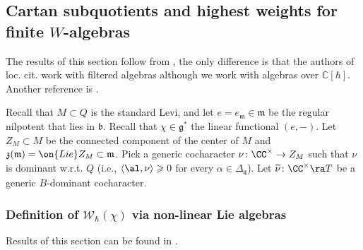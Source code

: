 \documentclass[12pt]{amsart}
\begin{document}
    










\subsection{Cartan subquotients and highest weights for finite $W$-algebras}
The results of this section follow from \cite{BGK}, the only difference is that the authors of loc. cit. work with filtered algebras although we work with algebras over $\mathbb{C}[\hbar]$. Another reference is \cite{LosevStructureO}. 


Recall that $M \subset Q$ is the standard Levi, and let $e=e_{\mathfrak{m}} \in \mathfrak{m}$ be the regular nilpotent that lies in $\mathfrak{b}$. Recall that $\chi \in \mathfrak{g}^*$ the linear functional $(e,-)$.  Let $Z_M \subset M$ be the connected component of the center of $M$ and $\mathfrak{z}(\mathfrak{m})=\on{Lie}Z_M \subset \mathfrak{m}$. Pick a generic cocharacter $\nu\colon \CC^\times \rightarrow Z_M$ such that $\nu$ is dominant w.r.t. $Q$ (i.e., $\langle 
\al,\nu\rangle \geqslant 0$ for every $\alpha \in \Delta_{\mathfrak{q}}$).  Let $\widetilde{\nu}\colon \CC^\times \ra T$ be a generic $B$-dominant cocharacter.


\subsubsection{Definition of $\mathcal{W}_\hbar(\chi)$ via non-linear Lie algebras}
Results of this section can be found in \cite[Section 2.2]{BGK}. 
\end{document}

